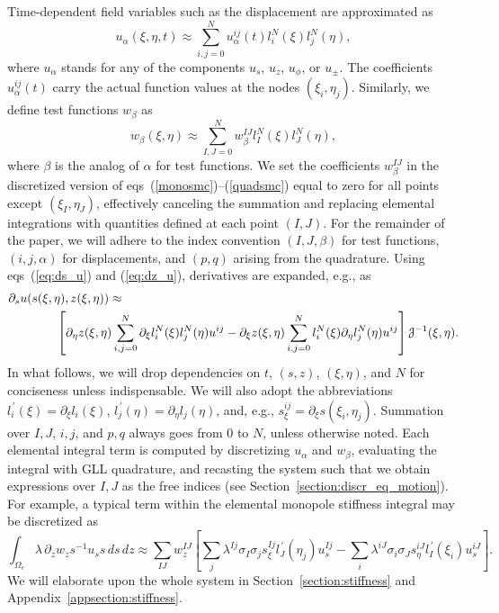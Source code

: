 \documentclass[11pt,letter,fleqn,english,notitlepage]{article}
\newcommand{\eq}{\begin{equation}} \newcommand{\en}{\end{equation}}
\newcommand{\eqa}{\begin{eqnarray}} \newcommand{\ena}{\end{eqnarray}}
\begin{document}
Time-dependent field variables such as the displacement are approximated as
%
\eq \label{eq:u_pol}
u_\alpha(\xi,\eta,t)\approx\sum\limits_{i,j=0}^{N}
u_\alpha^{ij}(t)l^N_i(\xi)l^N_j(\eta),
\en
%
where $u_\alpha$ stands for any of the components $u_s$, $u_z$, $u_\phi$, or 
$u_\pm$. 
The coefficients $u_\alpha^{ij}(t)$ carry the actual function values at the 
nodes $(\xi_i,\eta_j)$. Similarly, we define test functions $w_\beta$ as
\eq \label{eq:w_pol}
w_\beta(\xi,\eta)\approx\sum\limits_{I,J=0}^{N}w_\beta^{IJ}
l^N_I(\xi)l^N_J(\eta), 
\en
%
where $\beta$ is the analog of $\alpha$ for test functions. 
We set the coefficients $w^{IJ}_\beta$ in the discretized version of 
eqs~(\ref{monosmc})--(\ref{quadsmc}) equal to zero for all points except 
$(\xi_I,\eta_J)$, effectively canceling the summation and replacing 
elemental integrations with quantities defined at each point $(I,J)$.
For the remainder of the paper, we will adhere to the index convention 
$(I,J,\beta)$ for test functions, $(i,j,\alpha)$ for displacements, 
and $(p,q)$ arising from the quadrature.
%
Using eqs~(\ref{eq:ds_u}) and (\ref{eq:dz_u}), 
derivatives are expanded, e.g., as 
\eqa \label{eq:discrete_deriv}
\lefteqn{\partial_s u(s(\xi,\eta),z(\xi,\eta))\approx }\nonumber\\
&&\mbox{}\hspace{1.cm} %
\left[\partial_{\eta}z(\xi,\eta)\sum^N_{i,j=0}\partial_\xi l^N_i(\xi) 
l^N_j(\eta)u^{ij}
-\partial_{\xi}z(\xi,\eta)\sum^N_{i,j=0}l^N_i(\xi) 
\partial_\eta l^N_j(\eta)u^{ij}\right]{\mathcal J}^{-1}(\xi,\eta).
\ena
%
In what follows, we will drop dependencies on $t$, $(s,z)$, $(\xi,\eta)$, 
and $N$ for conciseness unless indispensable. We will also adopt the 
abbreviations 
$l^{\,\prime}_i(\xi)=\partial_\xi l_i(\xi)$, 
$l^{\,\prime}_j(\eta)=\partial_\eta l_j(\eta)$, and, e.g.,  
$s^{ij}_\xi=\partial_\xi s\left(\xi_i,\eta_j\right)$. 
Summation over $I,J$, $i,j$, and $p,q$ always goes from $0$ to $N$, 
unless otherwise noted.
Each elemental integral term is computed by discretizing 
$u_\alpha$ and $w_\beta$, evaluating the integral with GLL quadrature,
and recasting the system such that we obtain expressions over $I,J$ 
as the free indices (see Section~\ref{section:discr_eq_motion}). 
For example, a typical term within the elemental 
monopole stiffness integral may be discretized as 
%
\eq
\int_{\Omega_e}\lambda\,\partial_z{w_z}
s^{-1}u_s s\,ds\,dz  \approx
\sum_{IJ}w_z^{IJ}
\left[\sum_j\lambda^{Ij}\sigma_I
\sigma_j s_\xi^{Ij}l^{\,\prime}_{J}(\eta_j)u_s^{Ij}
-\sum_i\lambda^{iJ}\sigma_i
\sigma_J s^{iJ}_{\eta} l^{\,\prime}_{I}(\xi_i)u_s^{iJ}
\right].
\en
%
We will elaborate upon the whole system in Section~\ref{section:stiffness} 
and Appendix~\ref{appsection:stiffness}.
%
\end{document}
